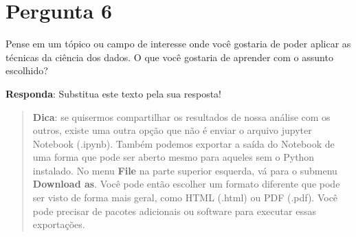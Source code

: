\documentclass[11pt]{article}
\begin{document}
    \section{Pergunta 6}\label{pergunta-6}

Pense em um tópico ou campo de interesse onde você gostaria de poder
aplicar as técnicas da ciência dos dados. O que você gostaria de
aprender com o assunto escolhido?

\textbf{Responda}: Substitua este texto pela sua resposta!

    \begin{quote}
\textbf{Dica}: se quisermos compartilhar os resultados de nossa análise
com os outros, existe uma outra opção que não é enviar o arquivo jupyter
Notebook (.ipynb). Também podemos exportar a saída do Notebook de uma
forma que pode ser aberto mesmo para aqueles sem o Python instalado. No
menu \textbf{File} na parte superior esquerda, vá para o submenu
\textbf{Download as}. Você pode então escolher um formato diferente que
pode ser visto de forma mais geral, como HTML (.html) ou PDF (.pdf).
Você pode precisar de pacotes adicionais ou software para executar essas
exportações.
\end{quote}


    
    
    
    
\end{document}
